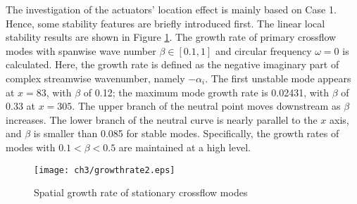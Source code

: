 The investigation of the actuators' location effect is mainly based on Case 1. Hence, some stability features are briefly introduced first. The linear local stability results are shown in Figure \ref{f:LST}. The growth rate of primary crossflow modes with spanwise wave number $\beta\in[0.1,1]$ and circular frequency $\omega = 0$ is calculated. Here, the growth rate is defined as the negative imaginary part of complex streamwise wavenumber, namely $-\alpha_i$. The first unstable mode appears at $x = 83$, with $\beta$ of 0.12; the maximum mode growth rate is 0.02431, with $\beta$ of 0.33 at $x =305$. The upper branch of the neutral point moves downstream as $\beta$ increases. The lower branch of the neutral curve is nearly parallel to the $x$ axis, and $\beta$ is smaller than 0.085 for stable modes. Specifically, the growth rates of modes with $0.1<\beta<0.5$ are maintained at a high level.
\begin{figure}
  \centering
  \texttt{[image: ch3/growthrate2.eps]}\\
  \caption{Spatial growth rate of stationary crossflow modes}\label{f:LST}
\end{figure}

